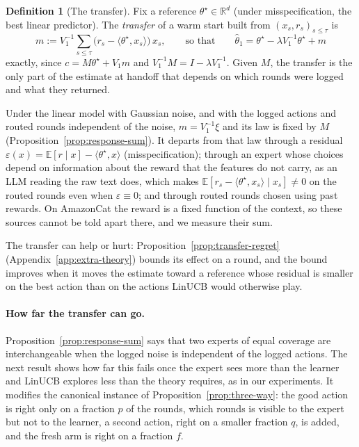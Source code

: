 \documentclass{article}
\theoremstyle{definition}
\newtheorem{definition}{Definition}
\theoremstyle{remark}
\newcommand{\R}{\mathbb{R}}
\newcommand{\E}{\mathbb{E}}
\theoremstyle{remark}
\begin{document}
\begin{definition}[The transfer]
\label{prop:transfer}
Fix a reference $\theta^\star\in\R^d$ (under misspecification, the best linear
predictor). The \emph{transfer} of a warm start built from
$(x_s,r_s)_{s\le\tau}$ is
\[
m:=V_1^{-1}\sum_{s\le\tau}\bigl(r_s-\langle\theta^\star,x_s\rangle\bigr)\,x_s,
\qquad\text{so that}\qquad
\widehat\theta_1=\theta^\star-\lambda V_1^{-1}\theta^\star+m
\]
exactly, since $c=M\theta^\star+V_1m$ and $V_1^{-1}M=I-\lambda V_1^{-1}$.
Given $M$, the transfer is the only part of the estimate at handoff that
depends on which rounds were logged and what they returned.
\end{definition}

Under the linear model with Gaussian noise, and with the logged actions and
routed rounds independent of the noise, $m=V_1^{-1}\xi$ and its law is fixed
by $M$ (Proposition~\ref{prop:response-sum}). It departs from that law
through a residual $\varepsilon(x)=\E[r\mid x]-\langle\theta^\star,x\rangle$
(misspecification); through an expert whose choices depend on information
about the reward that the features do not carry, as an LLM reading the raw
text does, which makes $\E[r_s-\langle\theta^\star,x_s\rangle\mid x_s]\ne0$ on
the routed rounds even when $\varepsilon\equiv0$; and through routed rounds
chosen using past rewards. On AmazonCat the reward is a fixed function of the
context, so these sources cannot be told apart there, and we measure their sum.

The transfer can help or hurt: Proposition~\ref{prop:transfer-regret}
(Appendix~\ref{app:extra-theory}) bounds its effect on a round, and the bound improves when it moves the
estimate toward a reference whose residual is smaller on the best action than
on the actions LinUCB would otherwise play.

\paragraph{How far the transfer can go.}
Proposition~\ref{prop:response-sum} says that two experts of equal coverage
are interchangeable when the logged noise is independent of the logged
actions. The next result shows how far this fails once the expert sees more
than the learner and LinUCB explores less than the theory requires, as in our
experiments. It modifies the canonical instance of
Proposition~\ref{prop:three-way}: the good action is right only on a fraction
$p$ of the rounds, which rounds is visible to the expert but not to the
learner, a second action, right on a smaller fraction $q$, is added, and the
fresh arm is right on a fraction $f$.
\end{document}
